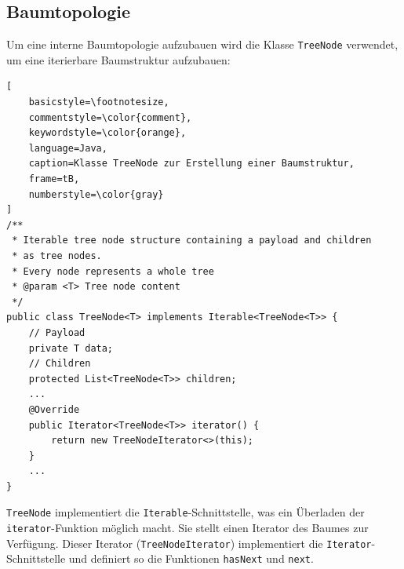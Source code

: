\newpage

\subsection*{Baumtopologie}
Um eine interne Baumtopologie aufzubauen wird die Klasse \texttt{TreeNode} verwendet, um eine iterierbare Baumstruktur
aufzubauen:
\begin{lstlisting}[
    basicstyle=\footnotesize,
    commentstyle=\color{comment},
    keywordstyle=\color{orange},
    language=Java,
    caption=Klasse TreeNode zur Erstellung einer Baumstruktur,
    frame=tB,
    numberstyle=\color{gray}
]
/**
 * Iterable tree node structure containing a payload and children
 * as tree nodes.
 * Every node represents a whole tree
 * @param <T> Tree node content
 */
public class TreeNode<T> implements Iterable<TreeNode<T>> {
    // Payload
    private T data;
    // Children
    protected List<TreeNode<T>> children;
    ...
    @Override
    public Iterator<TreeNode<T>> iterator() {
        return new TreeNodeIterator<>(this);
    }
    ...
}
\end{lstlisting}

\texttt{TreeNode} implementiert die \texttt{Iterable}-Schnittstelle, was ein Überladen der \texttt{iterator}-Funktion möglich
macht.
Sie stellt einen Iterator des Baumes zur Verfügung.
Dieser Iterator (\texttt{TreeNodeIterator}) implementiert die \texttt{Iterator}-Schnittstelle und definiert so die Funktionen
\texttt{hasNext} und \texttt{next}.

\newpage

